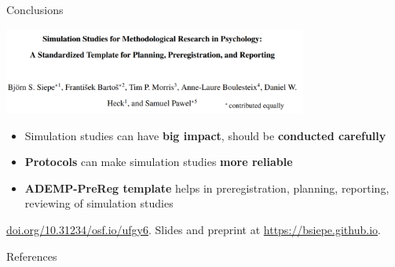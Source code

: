\documentclass[english, 12pt, aspectratio=169]{beamer}
\begin{document}
\begin{frame}{Conclusions}

  \begin{block}{}
    \centering
    \includegraphics[width = 0.75\textwidth,frame]{pics/siepeetal.png}

    \begin{itemize}
    \pause
      \item Simulation studies can have \alert{\textbf{big impact}}, should be
            \alert{\textbf{conducted carefully}}
      \pause
      \item \alert{\textbf{Protocols}} can make simulation studies
            \alert{\textbf{more reliable}}
      \pause
      \item \alert{\textbf{ADEMP-PreReg template}} helps in preregistration,
            planning, reporting, reviewing of simulation studies
    \end{itemize}
  \end{block}

  {\tiny \color{gray} \href{https://doi.org/10.31234/osf.io/ufgy6}{doi.org/10.31234/osf.io/ufgy6}. Slides and preprint at \href{https://bsiepe.github.io}{https://bsiepe.github.io}.}
\end{frame}

\begin{frame}[allowframebreaks]{References}
\scriptsize
  
  
\end{frame}
\end{document}
